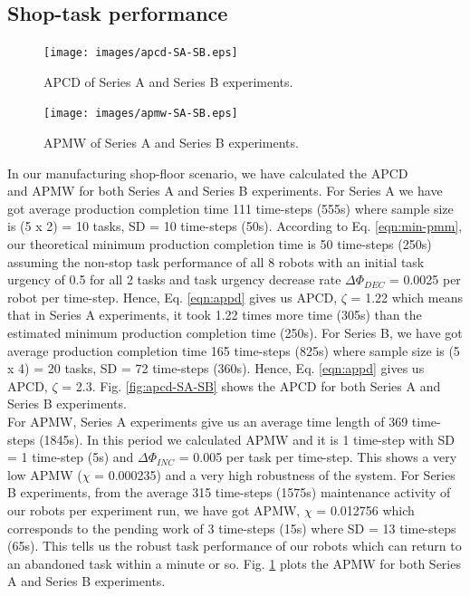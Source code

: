 \documentclass[preprint,12pt]{elsarticle}
\begin{document}
\subsection*{Shop-task performance}
\begin{figure}
\centering
\texttt{[image: images/apcd-SA-SB.eps]}
\caption{APCD of Series A and Series B experiments.}
\label{fig:apcd-SA-SB} 
\centering
\texttt{[image: images/apmw-SA-SB.eps]}
\caption{APMW of Series A and Series B experiments.}
\label{fig:apmw-SA-SB} %
\end{figure}
In our manufacturing shop-floor scenario, we have calculated the APCD\\ and APMW for both Series A and Series B experiments. For Series A we have got  average production completion time 111 time-steps (555s) where sample size is (5 x 2) = 10 tasks, SD = 10 time-steps (50s). According to Eq. \ref{eqn:min-pmm}, our theoretical minimum production completion time is 50 time-steps (250s) assuming the non-stop task performance of all 8 robots with an initial task urgency of 0.5 for all 2 tasks and task urgency decrease rate $\Delta \Phi_{DEC }$ = 0.0025 per robot per time-step.  Hence, Eq. \ref{eqn:appd} gives us APCD, $\zeta$ = 1.22 which means that in Series A experiments, it took 1.22 times more time (305s) than the estimated minimum production completion time (250s). For Series B, we have got average production completion time 165 time-steps (825s) where sample size is (5 x 4) = 20 tasks, SD = 72 time-steps (360s).  Hence, Eq. \ref{eqn:appd} gives us APCD, $\zeta$ = 2.3. Fig. \ref{fig:apcd-SA-SB} shows the APCD for both Series A and Series B experiments. \\
For APMW, Series A experiments give us an average time length of 369 time-steps (1845s).  In this period we calculated APMW and it is 1 time-step with SD = 1 time-step (5s) and $\Delta \Phi_{INC}$ = 0.005 per task per time-step. This shows a very low APMW ($\chi$ = 0.000235) and a very high robustness of the system. For Series B experiments, from the average 315 time-steps (1575s) maintenance activity of our robots per experiment run, we have got APMW, $\chi$ = 0.012756 which corresponds to the pending work of 3 time-steps (15s) where SD = 13 time-steps (65s). This tells us the robust task performance of our robots which can return to an abandoned task within a minute or so. Fig. \ref{fig:apmw-SA-SB} plots the APMW for both Series A and Series B experiments. 
\end{document}
